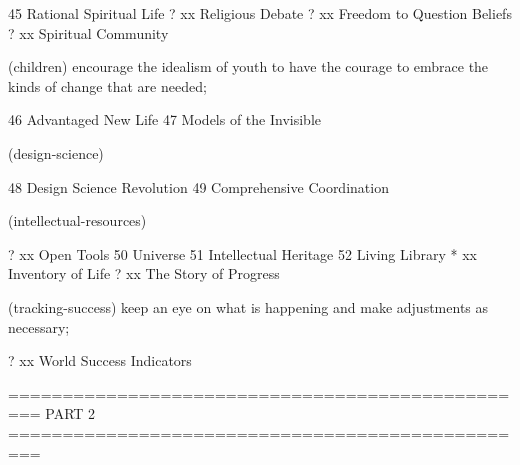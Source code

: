 	45  Rational Spiritual Life
?	xx  Religious Debate   %
?	xx  Freedom to Question Beliefs   %
?	xx  Spiritual Community   %

(children) encourage the idealism of youth to have the courage to embrace the kinds of change that are needed;

	46  Advantaged New Life
	47  Models of the Invisible

(design-science)

	48  Design Science Revolution
	49  Comprehensive Coordination

(intellectual-resources)

?	xx  Open Tools
	50  Universe
	51  Intellectual Heritage
	52  Living Library
*	xx  Inventory of Life   %
?	xx  The Story of Progress   %

(tracking-success) keep an eye on what is happening and make adjustments as necessary;

?	xx  World Success Indicators   %

=================================================
 PART 2
=================================================

